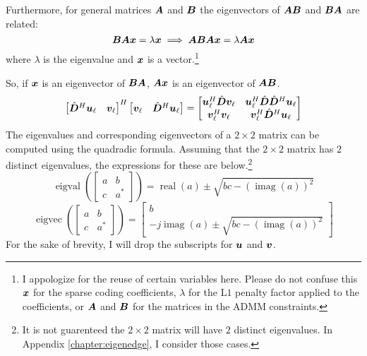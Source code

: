 Furthermore, for general matrices $\bm{A}$ and $\bm{B}$ the eigenvectors of $\bm{A}\bm{B}$ and $\bm{B}\bm{A}$ are related:
%
\begin{equation}
\bm{B}\bm{A}\bm{x} = \lambda\bm{x}  \implies  \bm{A}\bm{B}\bm{A}\bm{x} = \lambda\bm{A}\bm{x}
\end{equation}
%
where $\lambda$ is the eigenvalue and $\bm{x}$ is a vector.\footnote{I appologize for the reuse of certain variables here. Please do not confuse this $\bm{x}$ for the sparse coding coefficients, $\lambda$ for the L$1$ penalty factor applied to the coefficients, or $\bm{A}$ and $\bm{B}$ for the matrices in the ADMM constraints.}

So, if $\bm{x}$ is an eigenvector of $\bm{B}\bm{A}$, $\bm{A}\bm{x}$ is an eigenvector of $\bm{A}\bm{B}$.
%
%
\begin{equation}
\begin{bmatrix}
\hat{\bm{D}}^H\bm{u}_{\ell} & \bm{v}_{\ell}
\end{bmatrix}^H
\begin{bmatrix}
\bm{v}_{\ell} & \hat{\bm{D}}^H\bm{u}_{\ell} 
\end{bmatrix}
 = 
\begin{bmatrix}
\bm{u}_{\ell}^H\hat{\bm{D}}\bm{v}_{\ell} & \bm{u}_{\ell}^H\hat{\bm{D}}\hat{\bm{D}}^H\bm{u}_{\ell} \\
\bm{v}_{\ell}^H\bm{v}_{\ell}    & \bm{v}_{\ell}^H\hat{\bm{D}}^H\bm{u}_{\ell}
\end{bmatrix}
\end{equation}
%
The eigenvalues and corresponding eigenvectors of a $2 \times 2$ matrix can be computed using the quadradic formula. Assuming that the $2 \times 2$ matrix has $2$ distinct eigenvalues, the expressions for these are below.\footnote{It is not guarenteed the $2 \times 2$ matrix will have $2$ distinct eigenvalues. In Appendix \ref{chapter:eigenedge}, I consider those cases.}
%
\begin{equation}
\operatorname{eigval}\left(\begin{bmatrix} a & b \\ c & a^* \end{bmatrix}\right) = \operatorname{real}(a) \pm \sqrt{bc - (\operatorname{imag}(a))^2}
\end{equation}
%
\begin{equation}
\operatorname{eigvec}\left(\begin{bmatrix} a & b \\ c & a^* \end{bmatrix}\right) = \begin{bmatrix} b \\ -j\operatorname{imag}(a) \pm \sqrt{bc - (\operatorname{imag}(a))^2}\end{bmatrix}
\end{equation}
%
For the sake of brevity, I will drop the subscripts for $\bm{u}$ and $\bm{v}$.

